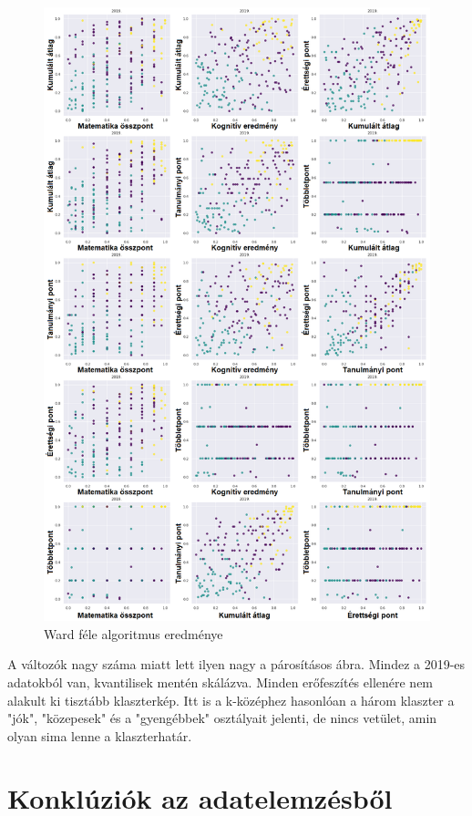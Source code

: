 \documentclass[12pt]{article}
\begin{document}
\begin{figure}[H]
\centering
\includegraphics[scale = 0.57]{kepek/klacterward.png}
\caption{Ward féle algoritmus eredménye}
\label{fig:klacterward}
\end{figure}

A változók nagy száma miatt lett ilyen nagy a párosításos ábra. Mindez a 2019-es adatokból van, kvantilisek mentén skálázva. Minden erőfeszítés ellenére nem alakult ki tisztább klaszterkép. Itt is a k-középhez hasonlóan a három klaszter a "jók", "közepesek" és a "gyengébbek" osztályait jelenti, de nincs vetület, amin olyan sima lenne a klaszterhatár.


\section{Konklúziók az adatelemzésből}
\end{document}
